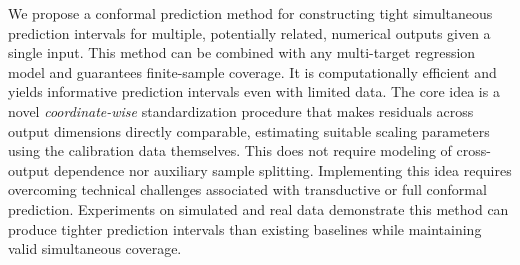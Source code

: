 We propose a conformal prediction method for constructing tight simultaneous prediction intervals for multiple, potentially related, numerical outputs given a single input. This method can be combined with any multi-target regression model and guarantees finite-sample coverage. It is computationally efficient and yields informative prediction intervals even with limited data. The core idea is a novel \emph{coordinate-wise} standardization procedure that makes residuals across output dimensions directly comparable, estimating suitable scaling parameters using the calibration data themselves. This does not require modeling of cross-output dependence nor auxiliary sample splitting. Implementing this idea requires overcoming technical challenges associated with transductive or full conformal prediction. Experiments on simulated and real data demonstrate this method can produce tighter prediction intervals than existing baselines while maintaining valid simultaneous coverage.

